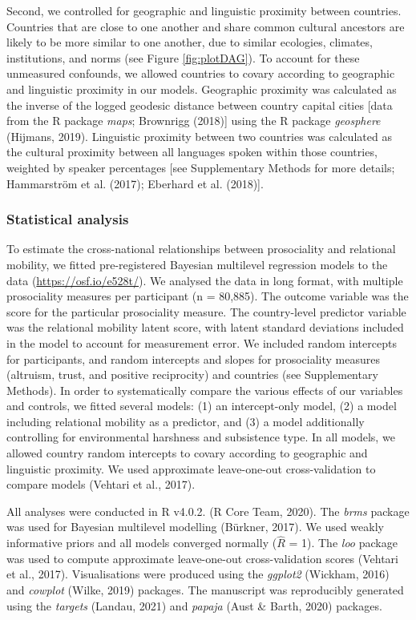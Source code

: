 \documentclass[
  man,floatsintext]{apa6}
\begin{document}
Second, we controlled for geographic and linguistic proximity between countries. Countries that are close to one another and share common cultural ancestors are likely to be more similar to one another, due to similar ecologies, climates, institutions, and norms (see Figure \ref{fig:plotDAG}). To account for these unmeasured confounds, we allowed countries to covary according to geographic and linguistic proximity in our models. Geographic proximity was calculated as the inverse of the logged geodesic distance between country capital cities {[}data from the R package \emph{maps}; Brownrigg (2018){]} using the R package \emph{geosphere} (Hijmans, 2019). Linguistic proximity between two countries was calculated as the cultural proximity between all languages spoken within those countries, weighted by speaker percentages {[}see Supplementary Methods for more details; Hammarström et al. (2017); Eberhard et al. (2018){]}.

\hypertarget{statistical-analysis}{%
\subsubsection{Statistical analysis}\label{statistical-analysis}}

To estimate the cross-national relationships between prosociality and relational mobility, we fitted pre-registered Bayesian multilevel regression models to the data (\url{https://osf.io/e528t/}). We analysed the data in long format, with multiple prosociality measures per participant (n = 80,885). The outcome variable was the score for the particular prosociality measure. The country-level predictor variable was the relational mobility latent score, with latent standard deviations included in the model to account for measurement error. We included random intercepts for participants, and random intercepts and slopes for prosociality measures (altruism, trust, and positive reciprocity) and countries (see Supplementary Methods). In order to systematically compare the various effects of our variables and controls, we fitted several models: (1) an intercept-only model, (2) a model including relational mobility as a predictor, and (3) a model additionally controlling for environmental harshness and subsistence type. In all models, we allowed country random intercepts to covary according to geographic and linguistic proximity. We used approximate leave-one-out cross-validation to compare models (Vehtari et al., 2017).

All analyses were conducted in R v4.0.2. (R Core Team, 2020). The \emph{brms} package was used for Bayesian multilevel modelling (Bürkner, 2017). We used weakly informative priors and all models converged normally (\(\hat{R}\) = 1). The \emph{loo} package was used to compute approximate leave-one-out cross-validation scores (Vehtari et al., 2017). Visualisations were produced using the \emph{ggplot2} (Wickham, 2016) and \emph{cowplot} (Wilke, 2019) packages. The manuscript was reproducibly generated using the \emph{targets} (Landau, 2021) and \emph{papaja} (Aust \& Barth, 2020) packages.
\end{document}

